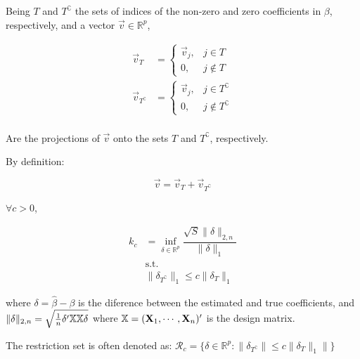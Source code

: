 \begin{Def}
Being $T$ and $T^{\complement}$ the sets of indices of the non-zero and zero coefficients in $\beta$, respectively, and a vector $\Vec{v} \in \mathbb{R}^p$, 

\begin{align*}
    \Vec{v}_T &= \begin{cases}
        \Vec{v}_j, &  j \in T \\
        0, &  j \notin T
    \end{cases}\\
    \Vec{v}_{T^{\complement}} &= \begin{cases}
        \Vec{v}_j, &  j \in T^{\complement}\\
        0, &  j \notin T^{\complement}
    \end{cases}\\
\end{align*}

Are the projections of $\Vec{v}$ onto the sets $T$ and $T^{\complement}$, respectively.

By definition:

\[
\Vec{v} = \Vec{v}_T + \Vec{v}_{T^{\complement}}
\]
\end{Def}

\begin{Def}
$\forall c > 0$,

\begin{align*}
k_c &= \inf_{\delta \in \mathbb{R}^p}{
    \dfrac{\sqrt{S} \|\delta\|_{2, n}}{\|\delta\|_1}
}\\
&\text{s.t.}\\
&\|\delta_{T^{\complement}}\|_1 \leq c \|\delta_T\|_1
\end{align*}

where $\delta = \hat{\beta} - \beta$ is the diference between the estimated and true coefficients, and $\|\delta\|_{2, n} = \sqrt{\frac{1}{n} \delta'\mathbb{X}\mathbb{X}\delta}$ where $\mathbb{X} = (\mathbf{X}_1, \cdots, \mathbf{X}_n)'$ is the design matrix.

The restriction set is often denoted as:
$\mathcal{R}_{c} = \{\delta \in \mathbb{R}^p: \|\delta_{T^\complement}\| \leq c \|\delta_T\|_1\|\}$
\end{Def}


